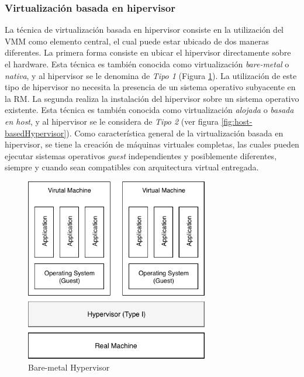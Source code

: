 \subsubsection{Virtualización basada en hipervisor}

La técnica de virtualización basada en hipervisor consiste en la utilización del VMM como elemento central, el cual puede estar ubicado de dos maneras diferentes. La primera forma consiste en ubicar el hipervisor directamente sobre el hardware. Esta técnica es también conocida como virtualización \textit{bare-metal} o \textit{nativa}, y al hipervisor se le denomina de \textit{Tipo 1} (Figura \ref{fig:Bare-metalHypervisor}).  La utilización de este tipo de hipervisor no necesita la presencia de un sistema operativo subyacente en la RM. La segunda realiza la instalación del hipervisor sobre un sistema operativo existente. Esta técnica es también conocida como virtualización \textit{alojada} o \textit{basada en host}, y al hipervisor se le considera de \textit{Tipo 2} (ver figura \ref{fig:host-basedHypervisor}). Como característica general de la virtualización basada en hipervisor, se tiene la creación de máquinas virtuales completas, las cuales pueden ejecutar sistemas operativos \textit{guest} independientes y posiblemente diferentes, siempre y cuando sean compatibles con arquitectura virtual entregada. 


\begin{figure}[!hbtp]
	\centering
	\includegraphics[width=8cm]{Pictures/bare-metalHypervisor.pdf}
	\vspace{-0.2cm}
	\caption{Bare-metal Hypervisor}
	\label{fig:Bare-metalHypervisor}
\end{figure}


